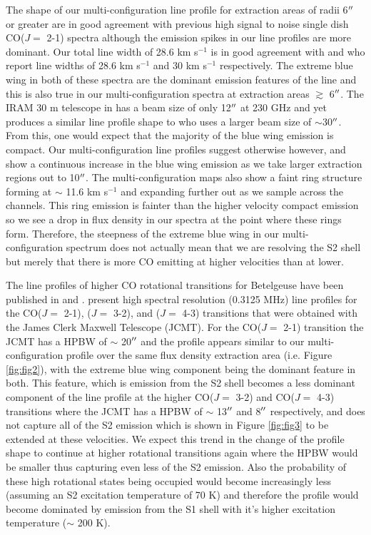 \documentclass[iop]{emulateapj}
\begin{document}
The shape of our multi-configuration line profile for extraction areas of radii 6$\mbox{$^{\prime\prime}$}$ or greater are in good agreement with previous high signal to noise single dish CO($J=$ 2-1) spectra \cite[e.g.][Fig. 1.]{1994ApJ...424L.127H} although the emission spikes in our line profiles are more dominant. Our total line width of 28.6 km s${}^{-1}$ is in good agreement with \cite{1987ApJ...313..400H} and \cite{1994ApJ...424L.127H} who report line widths of 28.6 km s${}^{-1}$ and 30 km s${}^{-1}$ respectively. The extreme blue wing in both of these spectra are the dominant emission features of the line and this is also true in our multi-configuration spectra at extraction areas $\gtrsim$ 6$\mbox{$^{\prime\prime}$}$. The IRAM 30 m telescope in \cite{1994ApJ...424L.127H} has a beam size of only 12$\mbox{$^{\prime\prime}$}$ at 230 GHz and yet produces a similar line profile shape to \cite{1987ApJ...313..400H} who uses a larger beam size of $\sim$30$\mbox{$^{\prime\prime}$}$. From this, one would expect that the majority of the blue wing emission is compact. Our multi-configuration line profiles suggest otherwise however, and show a continuous increase in the blue wing emission as we take larger extraction regions out to 10$\mbox{$^{\prime\prime}$}$. The multi-configuration maps also show a faint ring structure forming at $\sim$ 11.6 km s${}^{-1}$ and expanding further out as we sample across the channels. This ring emission is fainter than the higher velocity compact emission so we see a drop in flux density in our spectra at the point where these rings form. Therefore, the steepness of the extreme blue wing in our multi-configuration spectrum does not actually mean that we are resolving the S2 shell but merely that there is more CO emitting at higher velocities than at lower.

The line profiles of higher CO rotational transitions for Betelgeuse have been published in \cite{2003A&A...407..609K} and \cite{2010A&A...523A..18D}. \cite{2010A&A...523A..18D} present high spectral resolution (0.3125 MHz) line profiles for the CO($J=$ 2-1), ($J=$ 3-2), and ($J=$ 4-3) transitions that were obtained with the James Clerk Maxwell Telescope (JCMT). For the CO($J=$ 2-1) transition the JCMT has a HPBW of $\sim$ 20$\mbox{$^{\prime\prime}$}$ and the profile appears similar to our multi-configuration profile over the same flux density extraction area (i.e. Figure \ref{fig:fig2}), with the extreme blue wing component being the dominant feature in both. This feature, which is emission from the S2 shell becomes a less dominant component of the line profile at the higher CO($J=$ 3-2) and CO($J=$ 4-3) transitions where the JCMT has a HPBW of $\sim$ 13$\mbox{$^{\prime\prime}$}$ and 8$\mbox{$^{\prime\prime}$}$ respectively, and does not capture all of the S2 emission which is shown in Figure \ref{fig:fig3} to be extended at these velocities. We expect this trend in the change of the profile shape to continue at higher rotational transitions again where the HPBW would be smaller thus capturing even less of the S2 emission. Also the probability of these high rotational states being occupied would become increasingly less (assuming an S2 excitation temperature of 70 K) and therefore the profile would become dominated by emission from the S1 shell with it's higher excitation temperature ($\sim$ 200 K).
\end{document}
